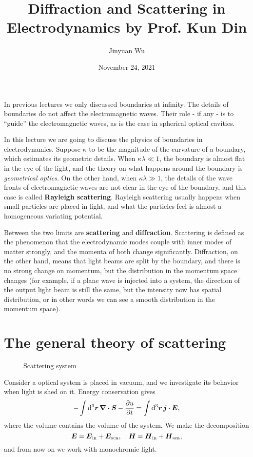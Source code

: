 \documentclass[hyperref, a4paper]{article}
\title{Diffraction and Scattering in Electrodynamics by Prof. Kun Din}
\author{Jinyuan Wu}
\date{November 24, 2021}
\newcommand*{\concept}[1]{{\textbf{#1}}}
\begin{document}
\maketitle

In previous lectures we only discussed boundaries at infinity. The details of boundaries do not affect the 
electromagnetic waves. Their role - if any - is to ``guide'' the electromagnetic waves, as is the case in 
spherical optical cavities. 

In this lecture we are going to discuss the physics of boundaries in electrodynamics.
Suppose $\kappa$ to be the magnitude of the curvature of a boundary, which estimates its geometric details.
When $\kappa \lambda \ll 1$, the boundary is almost flat in the eye of the light, and the theory on 
what happens around the boundary is \emph{geometrical optics}. 
On the other hand, when $\kappa \lambda \gg 1$, the details of the wave fronts of electromagnetic waves 
are not clear in the eye of the boundary, and this case is called \concept{Rayleigh scattering}.
Rayleigh scattering usually happens when small particles are placed in light, and what the particles 
feel is almost a homogeneous variating potential. 

Between the two limits are \concept{scattering} and \concept{diffraction}. Scattering is defined as the 
phenomenon that the electrodynamic modes couple with inner modes of matter strongly, and the momenta of 
both change significantly. Diffraction, on the other hand, means that light beams are split by the boundary, and
there is no strong change on momentum, but the distribution in the momentum space changes (for example, if a
plane wave is injected into a system, the direction of the output light beam is still the same, but the intensity
now has spatial distribution, or in other words we can see a smooth distribution in the momentum space).

\section{The general theory of scattering}

\begin{figure}
    \centering
    
    \caption{Scattering system}
\end{figure}

Consider a optical system is placed in vacuum, and we investigate its behavior when light is shed on it.
Energy conservation gives 
\begin{equation}
    - \int \dd[3]{\vb*{r}} \div{\vb*{S}} - \pdv{u}{t} = \int \dd[3]{\vb*{r}} \vb*{j} \cdot \vb*{E},
\end{equation}
where the volume contains the volume of the system.
We make the decomposition 
\begin{equation}
    \vb*{E} = \vb*{E}_\text{in} + \vb*{E}_\text{sca}, \quad \vb*{H} = \vb*{H}_\text{in} + \vb*{H}_\text{sca},
\end{equation}
and from now on we work with monochromic light. 
\end{document}
